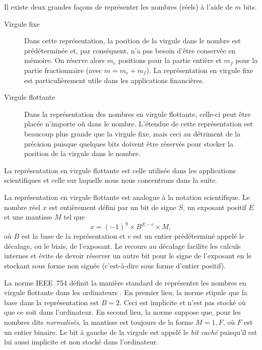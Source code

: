 \documentclass[letterpaper,11pt,english,french]{memoir}
\theoremstyle{plain}
\theoremstyle{definition}
\theoremstyle{remark}
\begin{document}
Il existe deux grandes façons de représenter les nombres (réels) à
l'aide de $m$ bits.
\begin{description}
\item[Virgule fixe] Dans cette représentation, la position de la
  virgule dans le nombre est prédéterminée et, par conséquent, n'a pas
  besoin d'être conservée en mémoire. On réserve alors $m_e$ positions
  pour la partie entière et $m_f$ pour la partie fractionnaire (avec
  $m = m_e + m_f$). La représentation en virgule fixe est
  particulièrement utile dans les applications financières.
\item[Virgule flottante] Dans la représentation des nombres en virgule
  flottante, celle-ci peut être placée n'importe où dans le nombre.
  L'étendue de cette représentation est beaucoup plus grande que la
  virgule fixe, mais ceci au détriment de la précision puisque
  quelques bits doivent être réservés pour stocker la position de la
  virgule dans le nombre.
\end{description}
La représentation en virgule flottante est celle utilisée dans les
applications scientifiques et celle sur laquelle nous nous concentrons
dans la suite.

La représentation en virgule flottante est analogue à la notation
scientifique. Le nombre réel $x$ est entièrement défini par un bit de
signe $S$, un exposant positif $E$ et une mantisse $M$ tel que
\begin{equation}
  \label{eq:ordinateurs:def_floating-point}
  x = (-1)^S \times B^{E - e} \times M,
\end{equation}
où $B$ est la base de la représentation et $e$ est un entier
prédéterminé appelé le décalage, ou le biais, de l'exposant. Le
recours au décalage facilite les calculs internes et évite de devoir
réserver un autre bit pour le signe de l'exposant en le stockant sous
forme non signée (c'est-à-dire sous forme d'entier positif).

La norme IEEE~754 définit la manière standard de représenter les
nombres en virgule flottante dans les ordinateurs \citep[][pour une
excellente présentation]{IEEE:754,Wikipedia:IEEE754}. En premier lieu,
la norme stipule que la base dans la représentation est $B = 2$. Ceci
est implicite et n'est pas stocké où que ce soit dans l'ordinateur. En
second lieu, la norme suppose que, pour les nombres dits
\emph{normalisés}, la mantisse est toujours de la forme $M = 1,F$, où
$F$ est un entier binaire. Le bit à gauche de la virgule est appelé le
\emph{bit caché} puisqu'il est lui aussi implicite et non stocké dans
l'ordinateur.
\end{document}
